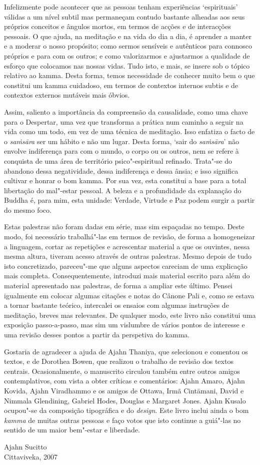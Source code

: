 Infelizmente pode acontecer que as pessoas tenham experiências `espirituais'
válidas a um nível subtil mas permaneçam contudo bastante alheadas aos seus
próprios conceitos e ângulos mortos, em termos de acções e de interacções
pessoais. O que ajuda, na meditação e na vida do dia a dia, é aprender a manter
e a moderar o nosso propósito; como sermos sensíveis e autênticos para connosco
próprios e para com os outros; e como valorizarmos e ajustarmos a qualidade de
esforço que colocamos nas nossas vidas. Tudo isto, e mais, se insere sob o
tópico relativo ao kamma. Desta forma, temos necessidade de conhecer muito bem o
que constitui um kamma cuidadoso, em termos de contextos internos subtis e de
contextos externos mutáveis mais óbvios.

Assim, saliento a importância da compreensão da causalidade, como uma chave para
o Despertar, uma vez que transforma a prática num caminho a seguir na vida como
um todo, em vez de uma técnica de meditação. Isso enfatiza o facto de o
\emph{saṁsāra} ser um hábito e não um lugar. Desta forma, `sair do
\emph{saṁsāra}' não envolve indiferença para com o mundo, o corpo ou os outros,
nem se refere à conquista de uma área de território psico"-espiritual refinado.
Trata"-se do abandono dessa negatividade, dessa indiferença e dessa ânsia; e isso
significa cultivar e honrar o bom kamma. Por sua vez, esta constitui a base para
a total libertação do mal"-estar pessoal. A beleza e a profundidade da explanação
do Buddha é, para mim, esta unidade: Verdade, Virtude e Paz podem surgir a
partir do mesmo foco.

Estas palestras não foram dadas em série, mas sim espaçadas no tempo. Deste
modo, foi necessário trabalhá"-las em termos de revisão, de forma a homogeneizar
a linguagem, cortar as repetições e acrescentar material a que os ouvintes,
nessa mesma altura, tiveram acesso através de outras palestras. Mesmo depois de
tudo isto concretizado, pareceu"-me que alguns aspectos careciam de uma
explicação mais completa. Consequentemente, introduzi mais material escrito para
além do material apresentado nas palestras, de forma a ampliar este último.
Pensei igualmente em colocar algumas citações e notas do Cânone Pali e, como se
estava a tornar bastante teórico, intercalei os ensaios com algumas instruções
de meditação, breves mas relevantes. De qualquer modo, este livro não constitui
uma exposição passo-a-passo, mas sim um vislumbre de vários pontos de interesse
e uma revisão desses pontos a partir da perspetiva do kamma.

Gostaria de agradecer a ajuda de Ajahn Thaniya, que selecionou e comentou os
textos, e de Dorothea Bowen, que realizou o trabalho de revisão dos textos
centrais. Ocasionalmente, o manuscrito circulou também entre outros amigos
contemplativos, com vista a obter críticas e comentários: Ajahn Amaro, Ajahn
Kovida, Ajahn Viradhammo e os amigos de Ottawa, Irmã Cintāmani, David e Nimmala
Glendining, Gabriel Hodes, Douglas e Margaret Jones. Ajahn Kusalo ocupou"-se da
composição tipográfica e do \emph{design}. Este livro inclui ainda o bom
\emph{kamma} de muitas outras pessoas e faço votos que isto continue a guiá"-las
no sentido de um maior bem"-estar e liberdade.

\bigskip

{\raggedleft
Ajahn Sucitto\\
Cittaviveka, 2007
\par}
